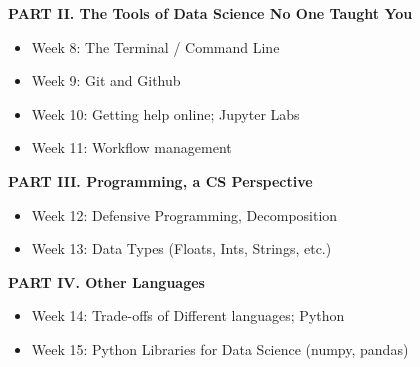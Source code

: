 \documentclass[12pt]{article}
\begin{document}
\vspace{.4in}
\begin{center}
	\textbf{PART II. The Tools of Data Science No One Taught You}
\end{center}
\vspace{.2in}

\begin{itemize}
	\item Week 8: The Terminal / Command Line
	\item Week 9: Git and Github
	\item Week 10: Getting help online; Jupyter Labs
	\item Week 11: Workflow management
\end{itemize}

\vspace{.4in}
\begin{center}
	\textbf{PART III. Programming, a CS Perspective}
\end{center}
\vspace{.2in}

\begin{itemize}
	\item Week 12: Defensive Programming, Decomposition
	\item Week 13: Data Types (Floats, Ints, Strings, etc.)
\end{itemize}

\vspace{.4in}
\begin{center}
	\textbf{PART IV. Other Languages}
\end{center}
\vspace{.2in}

\begin{itemize}
	\item Week 14: Trade-offs of Different languages; Python
	\item Week 15: Python Libraries for Data Science (numpy, pandas)
\end{itemize}
\end{document}
